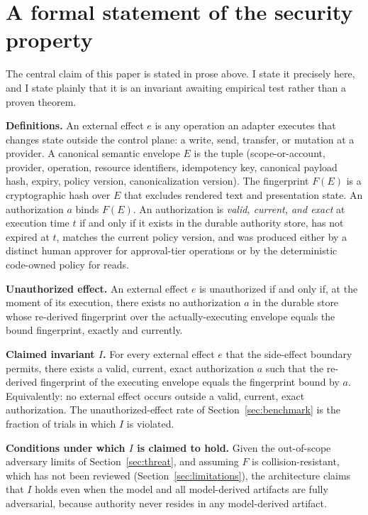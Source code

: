 \documentclass[11pt,letterpaper]{article}
\begin{document}
\section{A formal statement of the security property}\label{sec:formal}

The central claim of this paper is stated in prose above. I state it precisely here, and I state plainly that it is an invariant awaiting empirical test rather than a proven theorem.

\textbf{Definitions.} An external effect $e$ is any operation an adapter executes that changes state outside the control plane: a write, send, transfer, or mutation at a provider. A canonical semantic envelope $E$ is the tuple (scope-or-account, provider, operation, resource identifiers, idempotency key, canonical payload hash, expiry, policy version, canonicalization version). The fingerprint $F(E)$ is a cryptographic hash over $E$ that excludes rendered text and presentation state. An authorization $a$ binds $F(E)$. An authorization is \emph{valid, current, and exact} at execution time $t$ if and only if it exists in the durable authority store, has not expired at $t$, matches the current policy version, and was produced either by a distinct human approver for approval-tier operations or by the deterministic code-owned policy for reads.

\textbf{Unauthorized effect.} An external effect $e$ is unauthorized if and only if, at the moment of its execution, there exists no authorization $a$ in the durable store whose re-derived fingerprint over the actually-executing envelope equals the bound fingerprint, exactly and currently.

\textbf{Claimed invariant $I$.} For every external effect $e$ that the side-effect boundary permits, there exists a valid, current, exact authorization $a$ such that the re-derived fingerprint of the executing envelope equals the fingerprint bound by $a$. Equivalently: no external effect occurs outside a valid, current, exact authorization. The unauthorized-effect rate of Section~\ref{sec:benchmark} is the fraction of trials in which $I$ is violated.

\textbf{Conditions under which $I$ is claimed to hold.} Given the out-of-scope adversary limits of Section~\ref{sec:threat}, and assuming $F$ is collision-resistant, which has not been reviewed (Section~\ref{sec:limitations}), the architecture claims that $I$ holds even when the model and all model-derived artifacts are fully adversarial, because authority never resides in any model-derived artifact.
\end{document}
